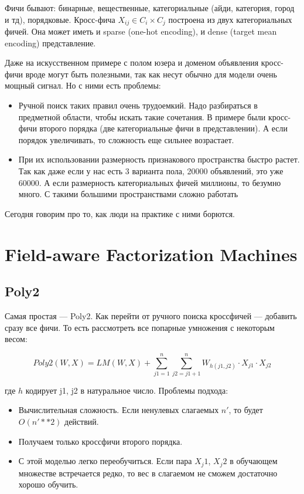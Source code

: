 Фичи бывают: бинарные, вещественные, категориальные (айди, категория, город и тд), порядковые. Кросс-фича $X_{ij} \in C_i \times C_j$ построена из двух категориальных фичей. Она может иметь и sparse (one-hot encoding), и dense (target mean encoding) представление. 

Даже на искусственном примере с полом юзера и доменом объявления кросс-фичи вроде могут быть полезными, так как несут обычно для модели очень мощный сигнал. Но с ними есть проблемы:
\begin{itemize}
    \item  Ручной поиск таких правил очень трудоемкий. Надо разбираться в предметной области, чтобы искать такие сочетания. В примере были кросс-фичи второго порядка (две категориальные фичи в представлении). А если порядок увеличивать, то сложность еще сильнее возрастает.
    
    \item При их использовании размерность признакового пространства быстро растет. Так как даже если у нас есть 3 варианта пола, 20000 объявлений, это уже 60000. А если размерность категориальных фичей миллионы, то безумно много. С такими большими пространствами сложно работать
\end{itemize}

Сегодня говорим про то, как люди на практике с ними борются.

\section{Field-aware Factorization Machines} 

\subsection{Poly2} 

Самая простая --- Poly2. Как перейти от ручного поиска кроссфичей --- добавить сразу все фичи. То есть рассмотреть все попарные умножения с некоторым весом:

$$ Poly2(W, X) = LM(W, X) + \sum_{j1=1}^{n} {\sum_{j2=j1+1}^{n} W_{h(j1, j2)}\cdot X_{j1} \cdot X_{j2}} $$

где $h$ кодирует j1, j2 в натуральное число. Проблемы подхода:
\begin{itemize}
    \item Вычислительная сложность. Если ненулевых слагаемых $n'$, то будет $O(n'**2)$ действий.
    \item Получаем только кроссфичи второго порядка.
    \item С этой моделью легко переобучиться. Если пара $X_j1$, $X_j2$ в обучающем множестве встречается редко, то вес в слагаемом не сможем достаточно хорошо обучить. 
\end{itemize}

